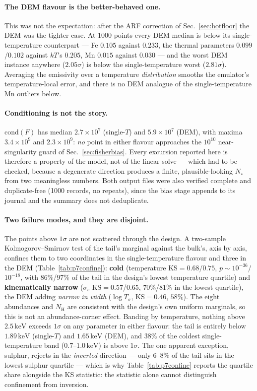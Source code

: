 \documentclass[11pt,a4paper]{article}
\newcommand{\nh}{N_{\mathrm{H}}}
\newcommand{\kev}{\,\mathrm{keV}}
\begin{document}
\paragraph{The DEM flavour is the better-behaved one.} This was not the
expectation: after the ARF correction of Sec.~\ref{sec:hotfloor} the DEM was the
tighter case. At 1000 points every DEM median is below its single-temperature
counterpart --- Fe $0.105$ against $0.233$, the thermal parameters
$0.099$/$0.102$ against $kT$'s $0.205$, Mn $0.015$ against $0.030$ --- and the
worst DEM instance anywhere ($2.05\sigma$) is below the single-temperature
worst ($2.81\sigma$). Averaging the emissivity over a temperature
\emph{distribution} smooths the emulator's temperature-local error, and there
is no DEM analogue of the single-temperature Mn outliers below.

\paragraph{Conditioning is not the story.} $\mathrm{cond}(F)$ has median
$2.7\times10^{7}$ (single-$T$) and $5.9\times10^{7}$ (DEM), with maxima
$3.4\times10^{9}$ and $2.3\times10^{9}$: \emph{no} point in either flavour
approaches the $10^{10}$ near-singularity guard of Sec.~\ref{sec:fisherbias}.
Every excursion reported here is therefore a property of the model, not of the
linear solve --- which had to be checked, because a degenerate direction
produces a finite, plausible-looking $N_\star$ from two meaningless numbers.
Both output files were also verified complete and duplicate-free (1000 records,
no repeats), since the bias stage appends to its journal and the summary does
not deduplicate.

\paragraph{Two failure modes, and they are disjoint.} The points above
$1\sigma$ are not scattered through the design. A two-sample
Kolmogorov--Smirnov test of the tail's marginal against the bulk's, axis by
axis, confines them to two coordinates in the single-temperature flavour and
three in the DEM (Table~\ref{tab:p7confine}): \textbf{cold} (temperature
$\mathrm{KS}=0.68$/$0.75$, $p\sim10^{-36}$/$10^{-18}$, with $86\%$/$97\%$ of
the tail in the design's lowest temperature quartile) and
\textbf{kinematically narrow} ($\sigma_v$ $\mathrm{KS}=0.57$/$0.65$, $70\%$/$81\%$
in the lowest quartile), the DEM adding \emph{narrow in width}
($\log T_\sigma$, $\mathrm{KS}=0.46$, $58\%$). The eight abundances and $\nh$
are consistent with the design's own uniform marginals, so this is not an
abundance-corner effect. Banding by temperature, nothing above
$2.5\kev$ exceeds $1\sigma$ on any parameter in either flavour: the tail is
entirely below $1.89\kev$ (single-$T$) and $1.65\kev$ (DEM), and $38\%$ of the
coldest single-temperature band ($0.7$--$1.0\kev$) is above $1\sigma$.
The one apparent exception, sulphur, rejects in the \emph{inverted} direction
--- only $6$--$8\%$ of the tail sits in the lowest sulphur quartile --- which is
why Table~\ref{tab:p7confine} reports the quartile share alongside the KS
statistic: the statistic alone cannot distinguish confinement from inversion.
\end{document}
